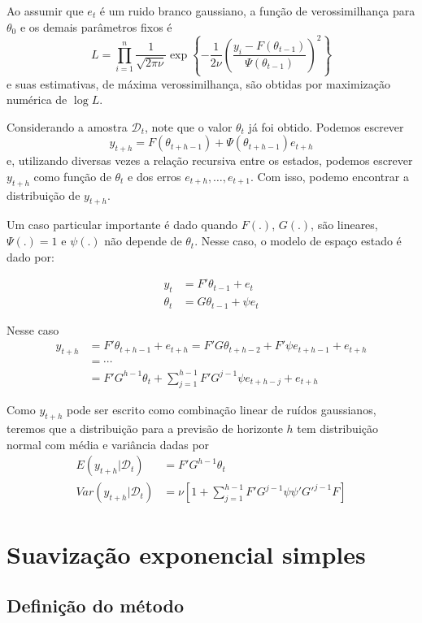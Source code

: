 \documentclass[
  letterpaper,
  DIV=11,
  numbers=noendperiod]{scrreprt}
\theoremstyle{definition}
\theoremstyle{plain}
\theoremstyle{definition}
\theoremstyle{plain}
\theoremstyle{remark}
\begin{document}
Ao assumir que \(e_t\) é um ruido branco gaussiano, a função de
verossimilhança para \(\theta_0\) e os demais parâmetros fixos é
\[L=\prod_{i=1}^n\frac{1}{\sqrt{2\pi\nu}}\exp\left\{-\frac{1}{2\nu}\left(\frac{y_i-F(\theta_{t-1})}{\Psi(\theta_{t-1})}\right)^2\right\}\]
e suas estimativas, de máxima verossimilhança, são obtidas por
maximização numérica de \(\log L\).

Considerando a amostra \(\mathcal{D}_t\), note que o valor \(\theta_t\)
já foi obtido. Podemos escrever
\[y_{t+h}=F(\theta_{t+h-1})+\Psi(\theta_{t+h-1})e_{t+h}\] e, utilizando
diversas vezes a relação recursiva entre os estados, podemos escrever
\(y_{t+h}\) como função de \(\theta_t\) e dos erros
\(e_{t+h},\ldots, e_{t+1}\). Com isso, podemo encontrar a distribuição
de \(y_{t+h}\).

Um caso particular importante é dado quando \(F(.)\), \(G(.)\), são
lineares,\(\Psi(.)=1\) e \(\psi(.)\) não depende de \(\theta_t\). Nesse
caso, o modelo de espaço estado é dado por:

\[\begin{align}y_t&=F'\theta_{t-1}+e_t\\
\theta_t&= G\theta_{t-1}+\psi e_t
\end{align}\]

Nesse caso\[\begin{align}
y_{t+h}&=F'\theta_{t+h-1}+e_{t+h}=F'G\theta_{t+h-2}+F'\psi e_{t+h-1} + e_{t+h}\\
&=\cdots\\
&=F'G^{h-1}\theta_t+\sum_{j=1}^{h-1}F'G^{j-1}\psi e_{t+h-j}+e_{t+h}
\end{align}\]

Como \(y_{t+h}\) pode ser escrito como combinação linear de ruídos
gaussianos, teremos que a distribuição para a previsão de horizonte
\(h\) tem distribuição normal com média e variância dadas por
\[\begin{align}
E(y_{t+h}|\mathcal{D}_t)&=F'G^{h-1}\theta_t\\
Var(y_{t+h}|\mathcal{D}_t)&=\nu\left[1+\sum_{j=1}^{h-1}F'G^{j-1}\psi\psi'G'^{j-1}F\right]
\end{align}\]

\hypertarget{suavizauxe7uxe3o-exponencial-simples}{%
\section{Suavização exponencial
simples}\label{suavizauxe7uxe3o-exponencial-simples}}

\hypertarget{definiuxe7uxe3o-do-muxe9todo}{%
\subsection{Definição do método}\label{definiuxe7uxe3o-do-muxe9todo}}
\end{document}

